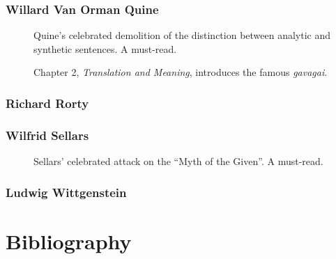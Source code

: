 \documentclass[11pt,twoside]{article}
\begin{document}
\begin{appendices}
\subsubsection{Willard Van Orman Quine}
\begin{description}
\item [\cite*{quine_two_1951}]  Quine's celebrated demolition of the distinction between analytic and synthetic sentences.  A must-read.
\item [\cite*{quine_word_1960}] Chapter 2, \textit{Translation and
  Meaning}, introduces the famous \textit{gavagai}.
\end{description}

\subsubsection{Richard Rorty}
\begin{description}
\item [\cite*{rorty_pmn}]
\item [\cite*{rorty_method_1981}]
\item [\cite*{rorty_representation_1988}]
\end{description}


\subsubsection{Wilfrid Sellars}
\begin{description}
\item [\cite*{sellars_empiricism_1997}]  Sellars' celebrated attack on the ``Myth of the Given''.  A must-read.
\end{description}

\subsubsection{Ludwig Wittgenstein}
\begin{description}
\item [\cite*{wittgenstein_philosophical_2009}]
\end{description}

\section{Bibliography}
\printbibliography[heading=none]
\end{appendices}
\end{document}
